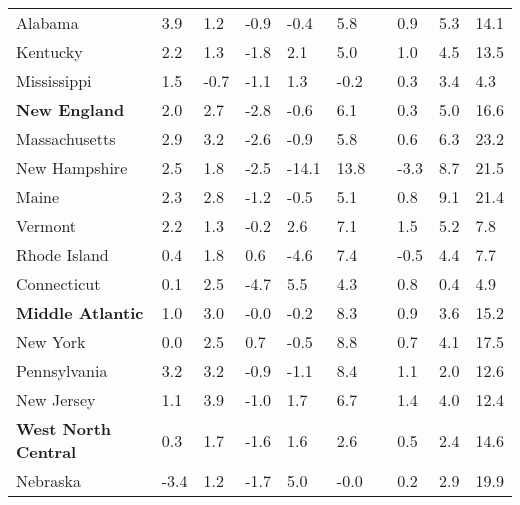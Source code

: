 {\begin{tabular}{p{30mm} R{7mm} R{7mm} R{7mm} R{7mm} 
             R{7mm} p{0mm} R{9mm} R{9mm} R{10mm} }
\hspace{3mm}  Alabama  & 3.9 & 1.2 & -0.9 & -0.4 & 5.8 &  & 0.9 & 5.3 & 14.1 \\
\hspace{3mm}  Kentucky  & 2.2 & 1.3 & -1.8 & 2.1 & 5.0 &  & 1.0 & 4.5 & 13.5 \\
\hspace{3mm}  Mississippi  & 1.5 & -0.7 & -1.1 & 1.3 & -0.2 &  & 0.3 & 3.4 & 4.3 \\
\hspace{1mm} \textbf{New England}  & 2.0 & 2.7 & -2.8 & -0.6 & 6.1 &  & 0.3 & 5.0 & 16.6 \\
\hspace{3mm}  Massachusetts  & 2.9 & 3.2 & -2.6 & -0.9 & 5.8 &  & 0.6 & 6.3 & 23.2 \\
\hspace{3mm}  New Hampshire  & 2.5 & 1.8 & -2.5 & -14.1 & 13.8 &  & -3.3 & 8.7 & 21.5 \\
\hspace{3mm}  Maine  & 2.3 & 2.8 & -1.2 & -0.5 & 5.1 &  & 0.8 & 9.1 & 21.4 \\
\hspace{3mm}  Vermont  & 2.2 & 1.3 & -0.2 & 2.6 & 7.1 &  & 1.5 & 5.2 & 7.8 \\
\hspace{3mm}  Rhode Island  & 0.4 & 1.8 & 0.6 & -4.6 & 7.4 &  & -0.5 & 4.4 & 7.7 \\
\hspace{3mm}  Connecticut  & 0.1 & 2.5 & -4.7 & 5.5 & 4.3 &  & 0.8 & 0.4 & 4.9 \\
\hspace{1mm} \textbf{Middle Atlantic}  & 1.0 & 3.0 & -0.0 & -0.2 & 8.3 &  & 0.9 & 3.6 & 15.2 \\
\hspace{3mm}  New York  & 0.0 & 2.5 & 0.7 & -0.5 & 8.8 &  & 0.7 & 4.1 & 17.5 \\
\hspace{3mm}  Pennsylvania  & 3.2 & 3.2 & -0.9 & -1.1 & 8.4 &  & 1.1 & 2.0 & 12.6 \\
\hspace{3mm}  New Jersey  & 1.1 & 3.9 & -1.0 & 1.7 & 6.7 &  & 1.4 & 4.0 & 12.4 \\
\hspace{1mm} \textbf{West North Central}  & 0.3 & 1.7 & -1.6 & 1.6 & 2.6 &  & 0.5 & 2.4 & 14.6 \\
\hspace{3mm}  Nebraska  & -3.4 & 1.2 & -1.7 & 5.0 & -0.0 &  & 0.2 & 2.9 & 19.9 \\

\end{tabular}}
